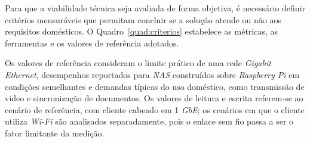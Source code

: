 Para que a viabilidade técnica seja avaliada de forma objetiva, é necessário definir critérios mensuráveis que permitam concluir se a solução atende ou não aos requisitos domésticos. O Quadro~\ref{quad:criterios} estabelece as métricas, as ferramentas e os valores de referência adotados.

Os valores de referência consideram o limite prático de uma rede \textit{Gigabit Ethernet}, desempenhos reportados para \textit{NAS} construídos sobre \textit{Raspberry Pi} em condições semelhantes \cite{gamess2025,homenas2025} e demandas típicas do uso doméstico, como transmissão de vídeo e sincronização de documentos. Os valores de leitura e escrita referem-se ao cenário de referência, com cliente cabeado em 1 \textit{GbE}; os cenários em que o cliente utiliza \textit{Wi-Fi} são analisados separadamente, pois o enlace sem fio passa a ser o fator limitante da medição.

